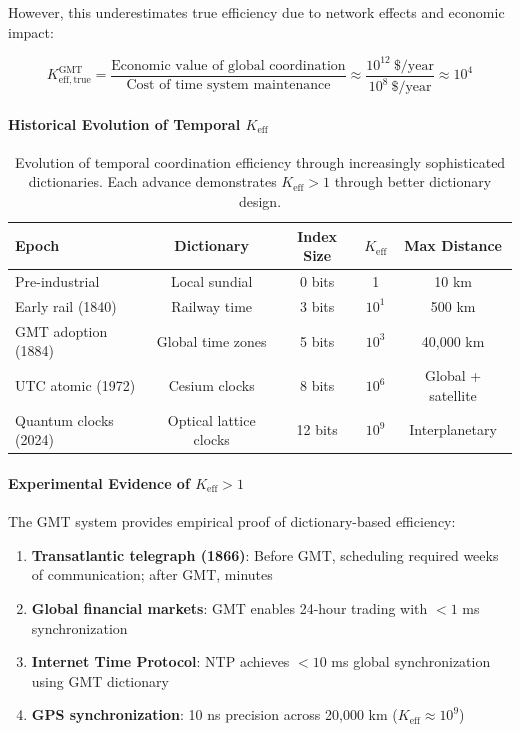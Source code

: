 \documentclass[11pt,a4paper]{article}
\begin{document}
	However, this underestimates true efficiency due to network effects and economic impact:
	
	\begin{equation}
		K_{\mathrm{eff, true}}^{\mathrm{GMT}} = \frac{\text{Economic value of global coordination}}{\text{Cost of time system maintenance}} \approx \frac{10^{12}\ \text{\$/year}}{10^8\ \text{\$/year}} \approx 10^4
	\end{equation}
	
	\paragraph{Historical Evolution of Temporal $K_{\mathrm{eff}}$}
	\begin{table}[htbp]
		\centering
		\begin{tabular}{lcccc}
			\toprule
			\textbf{Epoch} & \textbf{Dictionary} & \textbf{Index Size} & \textbf{$K_{\mathrm{eff}}$} & \textbf{Max Distance} \\
			\midrule
			Pre-industrial & Local sundial & 0 bits & 1 & 10 km \\
			Early rail (1840) & Railway time & 3 bits & $10^1$ & 500 km \\
			GMT adoption (1884) & Global time zones & 5 bits & $10^3$ & 40,000 km \\
			UTC atomic (1972) & Cesium clocks & 8 bits & $10^6$ & Global + satellite \\
			Quantum clocks (2024) & Optical lattice clocks & 12 bits & $10^9$ & Interplanetary \\
			\bottomrule
		\end{tabular}
		\caption{Evolution of temporal coordination efficiency through increasingly sophisticated dictionaries. Each advance demonstrates $K_{\mathrm{eff}} > 1$ through better dictionary design.}
		\label{tab:time-keff-evolution}
	\end{table}
	
	\paragraph{Experimental Evidence of $K_{\mathrm{eff}} > 1$}
	The GMT system provides empirical proof of dictionary-based efficiency:
	
	\begin{enumerate}
		\item \textbf{Transatlantic telegraph (1866)}: Before GMT, scheduling required weeks of communication; after GMT, minutes
		
		\item \textbf{Global financial markets}: GMT enables 24-hour trading with $<1$ ms synchronization
		
		\item \textbf{Internet Time Protocol}: NTP achieves $<10$ ms global synchronization using GMT dictionary
		
		\item \textbf{GPS synchronization}: 10 ns precision across 20,000 km ($K_{\mathrm{eff}} \approx 10^9$)
	\end{enumerate}
	
\end{document}

